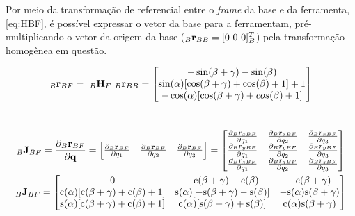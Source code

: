 Por meio da transformação de referencial entre o \textit{frame} da base e da ferramenta, \eqref{eq:HBF}, é possível expressar o vetor da base para a ferramentam, pré-multiplicando o vetor da origem da base ($_B\mathbf{r}_{BB} = [0 \ 0 \ 0]^T_B$) pela transformação homogênea em questão.

\begin{equation}\label{eq:r_BF_inB}
	_B \mathbf{r}_{BF} = \ _B\mathbf{H}_F \ _B\mathbf{r}_{BB} = \begin{bmatrix} - \sin(\beta + \gamma) - \sin(\beta) \\ \sin(\alpha)[\cos(\beta + \gamma) + \cos(\beta) + 1] + 1  \\ -\cos(\alpha)[\cos(\beta + \gamma) + cos(\beta) + 1] \end{bmatrix}
\end{equation}





\section{}

\begin{gather}\label{eq:J_BF_inB}
	_B \mathbf{J}_{BF} = \frac{\partial _B \mathbf{r}_{BF}}{\partial \mathbf{q}} = \begin{bmatrix}
		\frac{\partial _B \mathbf{r}_{BF}}{\partial q_1} & \frac{\partial_B \mathbf{r}_{BF}}{\partial q_2} & \frac{\partial _B \mathbf{r}_{BF}}{\partial q_3}\end{bmatrix} = \begin{bmatrix}
		\frac{\partial _B r_{xBF}}{\partial q_1} & \frac{\partial_B r_{xBF}}{\partial q_2} & \frac{\partial _B r_{xBF}}{\partial q_3} \\
		\frac{\partial _B r_{yBF}}{\partial q_1} & \frac{\partial_B r_{yBF}}{\partial q_2} & \frac{\partial _B r_{yBF}}{\partial q_3} \\
		\frac{\partial _B r_{zBF}}{\partial q_1} & \frac{\partial_B r_{zBF}}{\partial q_2} & \frac{\partial _B r_{zBF}}{\partial q_3} 
	\end{bmatrix} \\
	_B \mathbf{J}_{BF} = \begin{bmatrix}
	0	& -\text{c}(\beta + \gamma) - \text{c}(\beta)  & -\text{c}(\beta + \gamma) \\
	\text{c}(\alpha)[\text{c}(\beta + \gamma) + \text{c}(\beta) + 1]	& \text{s}(\alpha)[-\text{s}(\beta + \gamma) -\text{s}(\beta)] & -\text{s}(\alpha)\text{s}(\beta + \gamma) \\
	\text{s}(\alpha)[\text{c}(\beta + \gamma) + \text{c}(\beta) + 1]	&  \text{c}(\alpha)[\text{s}(\beta + \gamma) +\text{s}(\beta)] & \text{c}(\alpha)\text{s}(\beta + \gamma)
	\end{bmatrix}
\end{gather}

